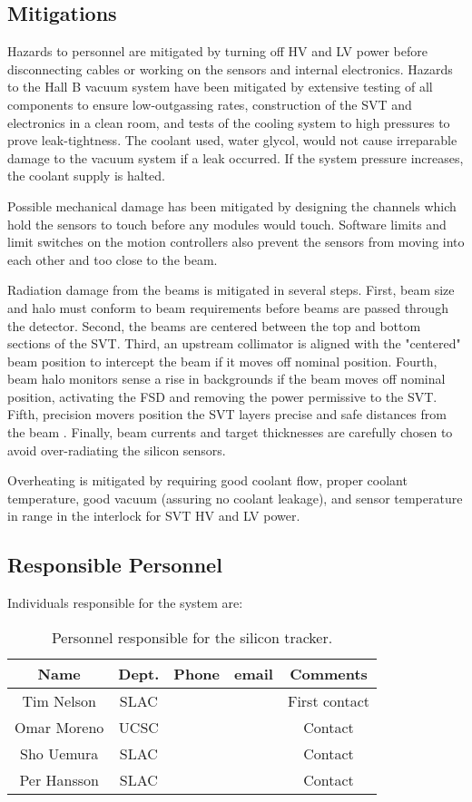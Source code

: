 \subsection{Mitigations}
\indent

Hazards to personnel are mitigated by turning off HV and LV power before disconnecting cables or working on the sensors and internal electronics.
Hazards to the Hall B vacuum system have been mitigated by extensive testing of all components to ensure low-outgassing rates, construction of the SVT and electronics in a clean room, and tests of the cooling system to high pressures to prove leak-tightness. The coolant used, water glycol, would not cause irreparable damage to the vacuum system if a leak occurred. If the system pressure  increases, the coolant supply is halted.

Possible mechanical damage has been mitigated by designing the channels which hold the sensors to touch before any modules would touch. Software limits and  limit switches on the motion controllers also prevent the sensors from moving into each other and too close to the beam.

Radiation damage from the beams is mitigated in several steps. First, beam size and halo must conform to beam requirements before beams are passed through the detector. Second, the beams are centered between the top and bottom sections of the SVT. Third, an upstream collimator is aligned with the "centered" beam position to intercept the beam if it moves off nominal position. Fourth, beam halo monitors sense a rise in backgrounds if the beam moves off nominal position, activating the FSD and removing the power permissive to the SVT. Fifth, precision movers position the SVT layers precise and safe distances from the beam . Finally, beam currents and target thicknesses are carefully chosen to avoid over-radiating the silicon sensors.

Overheating is mitigated by requiring good coolant flow, proper coolant temperature, good vacuum (assuring no coolant leakage), and sensor temperature in range  in the interlock for SVT HV and LV power. 

\subsection{Responsible Personnel}
\indent

Individuals responsible for the system are:

 \begin{table}[!htb]
 \centering
 \begin{tabular}{|c|c|c|c|c|}
\hline
 Name&Dept.&Phone&email&Comments \\ \hline
Tim Nelson& SLAC&&& First contact \\ \hline
Omar Moreno & UCSC & && Contact \\ \hline
Sho Uemura&SLAC& && Contact \\ \hline
Per Hansson&SLAC& && Contact \\ \hline
 \end{tabular}
\caption{ Personnel responsible for the silicon tracker.} 
\label{tb:beam}
\end{table}



